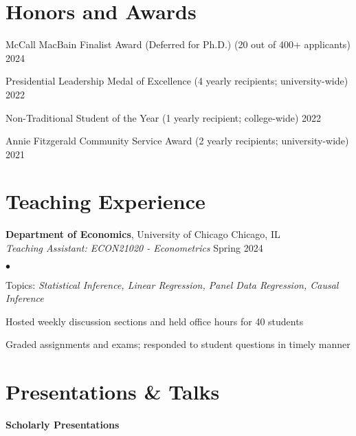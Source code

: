 \documentclass[margin,line, 10pt]{cv}
\newenvironment{list2}{
  \begin{list}{$\bullet$}{%
      \setlength{\itemsep}{0in}
      \setlength{\parsep}{0in} \setlength{\parskip}{0in}
      \setlength{\topsep}{0in} \setlength{\partopsep}{0in} 
      \setlength{\leftmargin}{0.2in}}}{\end{list}}
\begin{document}
\begin{resume}
\section{\sc Honors and Awards} 
McCall MacBain Finalist Award (Deferred for Ph.D.) (20 out of 400+ applicants) \hfill 2024

\vspace*{-2.5mm}
Presidential Leadership Medal of Excellence (4 yearly recipients; university-wide) \hfill 2022

\vspace*{-2.5mm}
Non-Traditional Student of the Year (1 yearly recipient; college-wide) \hfill 2022

\vspace*{-2.5mm}
Annie Fitzgerald Community Service Award (2 yearly recipients; university-wide) \hfill 2021

\section{\sc Teaching Experience}
{\bf Department of Economics}, University of Chicago \hfill Chicago, IL\\
{\em Teaching Assistant: ECON21020 - Econometrics} \hfill {Spring 2024}

\vspace*{.05in}
\begin{list2}
\item Topics: \emph{Statistical Inference, Linear Regression, Panel Data Regression, Causal Inference}
\item Hosted weekly discussion sections and held office hours for 40 students 
\item Graded assignments and exams; responded to student questions in timely manner  
\end{list2}

\section{\sc Presentations \& Talks}
{\bf Scholarly Presentations}
\vspace{-.3cm}


\end{resume}
\end{document}
